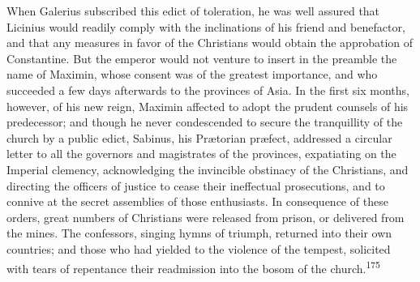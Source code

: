 When Galerius subscribed this edict of toleration, he was well
assured that Licinius would readily comply with the inclinations
of his friend and benefactor, and that any measures in favor of
the Christians would obtain the approbation of Constantine. But
the emperor would not venture to insert in the preamble the name
of Maximin, whose consent was of the greatest importance, and who
succeeded a few days afterwards to the provinces of Asia. In the
first six months, however, of his new reign, Maximin affected to
adopt the prudent counsels of his predecessor; and though he
never condescended to secure the tranquillity of the church by a
public edict, Sabinus, his Prætorian præfect, addressed a
circular letter to all the governors and magistrates of the
provinces, expatiating on the Imperial clemency, acknowledging
the invincible obstinacy of the Christians, and directing the
officers of justice to cease their ineffectual prosecutions, and
to connive at the secret assemblies of those enthusiasts. In
consequence of these orders, great numbers of Christians were
released from prison, or delivered from the mines. The
confessors, singing hymns of triumph, returned into their own
countries; and those who had yielded to the violence of the
tempest, solicited with tears of repentance their readmission
into the bosom of the church.\textsuperscript{175}


